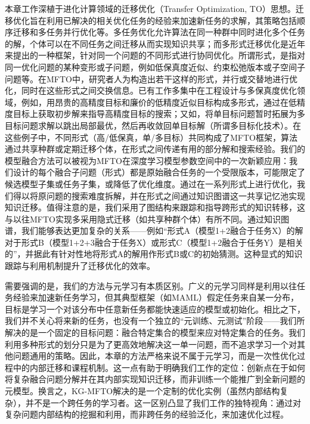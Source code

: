 \documentclass[../main.tex]{subfiles}
\begin{document}
\label{sec:ch5-2-3-transfer-optimization-multi-form-methods}
本章工作深植于进化计算领域的迁移优化（Transfer Optimization, TO）思想。迁移优化旨在利用已解决的相关优化任务的经验来加速新任务的求解，其策略包括顺序迁移和多任务并行优化等。多任务优化允许算法在同一种群中同时进化多个任务的解，个体可以在不同任务之间迁移从而实现知识共享；而多形式迁移优化是近年来提出的一种框架，针对同一个问题的不同形式进行协同优化。所谓形式，是指对同一优化问题的某种变形或子问题，例如低保真度近似、约束松弛版本或子空间子问题等。在MFTO中，研究者人为构造出若干这样的形式，并行或交替地进行优化，同时在这些形式之间交换信息。已有工作多集中在工程设计与多保真度优化领域，例如，用昂贵的高精度目标和廉价的低精度近似目标构成多形式，通过在低精度目标上获取初步解来指导高精度目标的搜索；又如，将单目标问题暂时拓展为多目标问题求解以跳出局部最优，然后再收敛回单目标解（所谓多目标化技术）。在这些例子中，不同形式（高/低保真，单/多目标）共同构成了MFTO框架，算法通过共享种群或定期迁移个体，在形式之间传递有用的部分解和搜索经验。我们的模型融合方法可以被视为MFTO在深度学习模型参数空间中的一次新颖应用：我们设计的每个融合子问题（形式）都是原始融合任务的一个受限版本，可能限定了候选模型子集或任务子集，或降低了优化维度。通过在一系列形式上进行优化，我们得以将原问题的搜索难度拆解，并在形式之间通过知识图谱这一共享记忆池实现知识迁移。值得注意的是，我们采用了图结构来跟踪和指导跨形式的知识转移，这与以往MFTO实现多采用隐式迁移（如共享种群个体）有所不同。通过知识图谱，我们能够表达更加复杂的关系——例如“形式A（模型1+2融合于任务X）的解对于形式B（模型1+2+3融合于任务X）或形式C（模型1+2融合于任务Y）是相关的”，并据此有针对性地将形式A的解用作形式B或C的初始猜测。这种显式的知识跟踪与利用机制提升了迁移优化的效率。

需要强调的是，我们的方法与元学习有本质区别。广义的元学习同样是利用以往任务经验来加速新任务学习，但其典型框架（如MAML）假定任务来自某一分布，目标是学习一个对该分布中任意新任务都能快速适应的模型或初始化。相比之下，我们并不关心将来新的任务，也没有一个独立的“元训练、元测试”阶段——我们所解决的是一个固定的目标问题：融合特定集合的模型来应对特定集合的任务。我们利用多种形式的划分只是为了更高效地解决这一单一问题，而不追求学习一个对其他问题通用的策略。因此，本章的方法严格来说不属于元学习，而是一次性优化过程中的内部迁移和课程机制。这一点有助于明确我们工作的定位：创新点在于如何将复杂融合问题分解并在其内部实现知识迁移，而非训练一个能推广到全新问题的元模型。换言之，KG-MFTO解决的是一个定制的优化实例（虽然内部结构复杂），并不是一个跨任务的学习者。这一区别凸显了我们工作的独特视角：通过对复杂问题内部结构的挖掘和利用，而非跨任务的经验泛化，来加速优化过程。
\end{document}
